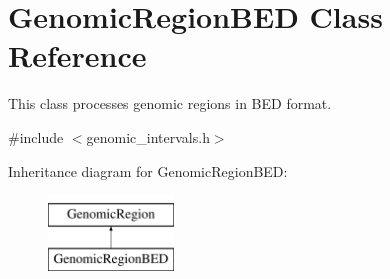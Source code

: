 \hypertarget{classGenomicRegionBED}{
\section{GenomicRegionBED Class Reference}
\label{classGenomicRegionBED}
}


This class processes genomic regions in BED format.  




{\ttfamily \#include $<$genomic\_\-intervals.h$>$}

Inheritance diagram for GenomicRegionBED:\begin{figure}[H]
\begin{center}
\leavevmode
\includegraphics[height=2.000000cm]{classGenomicRegionBED}
\end{center}
\end{figure}
